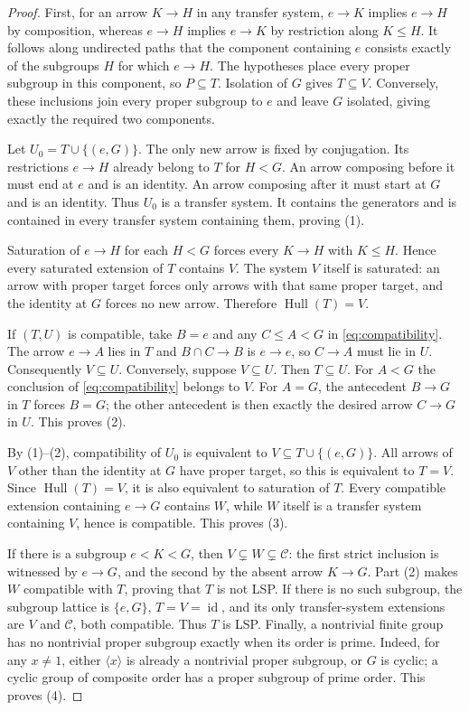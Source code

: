 \documentclass[11pt]{article}
\newcommand{\Hull}{\operatorname{Hull}}
\newcommand{\id}{\operatorname{id}}
\begin{document}
\begin{proof}
First, for an arrow $K\to H$ in any transfer system,
$e\to K$ implies $e\to H$ by composition, whereas $e\to H$
implies $e\to K$ by restriction along $K\leq H$.
It follows along undirected paths that the component containing $e$
consists exactly of the subgroups $H$ for which $e\to H$.
The hypotheses place every proper subgroup in this component, so
$P\subseteq T$. Isolation of $G$ gives $T\subseteq V$.
Conversely, these inclusions join every proper subgroup to $e$ and leave
$G$ isolated, giving exactly the required two components.

Let $U_0=T\cup\{(e,G)\}$. The only new arrow is fixed by conjugation.
Its restrictions $e\to H$ already belong to $T$ for $H<G$.
An arrow composing before it must end at $e$ and is an identity.
An arrow composing after it must start at $G$ and is an identity.
Thus $U_0$ is a transfer system. It contains the generators and is
contained in every transfer system containing them, proving (1).

Saturation of $e\to H$ for each $H<G$ forces every $K\to H$ with
$K\leq H$. Hence every saturated extension of $T$ contains $V$.
The system $V$ itself is saturated: an arrow with proper target forces
only arrows with that same proper target, and the identity at $G$
forces no new arrow. Therefore $\Hull(T)=V$.

If $(T,U)$ is compatible, take $B=e$ and any $C\leq A<G$ in
\eqref{eq:compatibility}. The arrow $e\to A$ lies in $T$ and
$B\cap C\to B$ is $e\to e$, so $C\to A$ must lie in $U$.
Consequently $V\subseteq U$.
Conversely, suppose $V\subseteq U$. Then $T\subseteq U$.
For $A<G$ the conclusion of \eqref{eq:compatibility} belongs to $V$.
For $A=G$, the antecedent $B\to G$ in $T$ forces $B=G$;
the other antecedent is then exactly the desired arrow $C\to G$ in $U$.
This proves (2).

By (1)--(2), compatibility of $U_0$ is equivalent to
$V\subseteq T\cup\{(e,G)\}$. All arrows of $V$ other than the
identity at $G$ have proper target, so this is equivalent to $T=V$.
Since $\Hull(T)=V$, it is also equivalent to saturation of $T$.
Every compatible extension containing $e\to G$ contains $W$, while
$W$ itself is a transfer system containing $V$, hence is compatible.
This proves (3).

If there is a subgroup $e<K<G$, then
$V\subsetneq W\subsetneq\mathcal C$: the first strict inclusion
is witnessed by $e\to G$, and the second by the absent arrow $K\to G$.
Part (2) makes $W$ compatible with $T$, proving that $T$ is not LSP.
If there is no such subgroup, the subgroup lattice is $\{e,G\}$,
$T=V=\id$, and its only transfer-system extensions are $V$ and
$\mathcal C$, both compatible. Thus $T$ is LSP.
Finally, a nontrivial finite group has no nontrivial proper subgroup
exactly when its order is prime. Indeed, for any $x\ne1$, either
$\langle x\rangle$ is already a nontrivial proper subgroup, or $G$ is
cyclic; a cyclic group of composite order has a proper subgroup of prime
order. This proves (4).
\end{proof}
\end{document}
